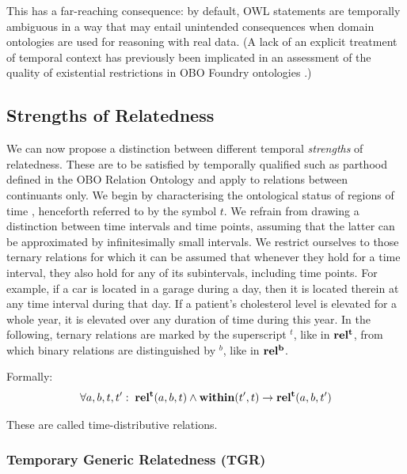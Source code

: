 This has a far-reaching consequence: by default, OWL statements are temporally ambiguous in a way that may entail unintended consequences when domain ontologies are used for reasoning with real data. (A lack of an explicit treatment of temporal context has previously been implicated in an assessment of the quality of existential restrictions in OBO Foundry ontologies \cite{boeker2011}.)

\subsection*{Strengths of Relatedness}

We can now propose a distinction between different temporal \emph{strengths} of relatedness. These are to be satisfied by temporally qualified such as parthood defined in the OBO Relation Ontology  and apply to relations between continuants only. 
We begin by characterising the ontological status of regions of time , henceforth referred to by the symbol $t$. We refrain from drawing a distinction between time intervals and time points, assuming that the latter can be approximated by infinitesimally small intervals.
We restrict ourselves to those ternary relations for which it can be assumed that whenever they hold for a time interval, 
they also hold for any of its subintervals, including time points. For example, if a car is located in a garage during a day, then it is located therein at any time interval during that day. If a patient's cholesterol level is elevated for a whole year, it is elevated over any duration of time during this year. 
In the following, ternary relations are marked by the superscript $^t$, like in $\mathrm{\mathbf{rel^t}}$, from which binary relations are  distinguished by
$^b$, like in $\mathrm{\mathbf{rel^b}}$.  



Formally:
\begin{equation}
\begin{split}
\forall a, b, t, t^\prime:\; \mathrm{\mathbf{rel^t}}(a, b, t) \wedge \mathrm{\mathbf{within}}(t^\prime,t) \rightarrow
\mathrm{\mathbf{rel^t}}(a,b,t^\prime)
\end{split}
\label{eq:temporarily:temp}
\end{equation}

These are called time-distributive relations.

\subsubsection*{Temporary Generic Relatedness (TGR)}

